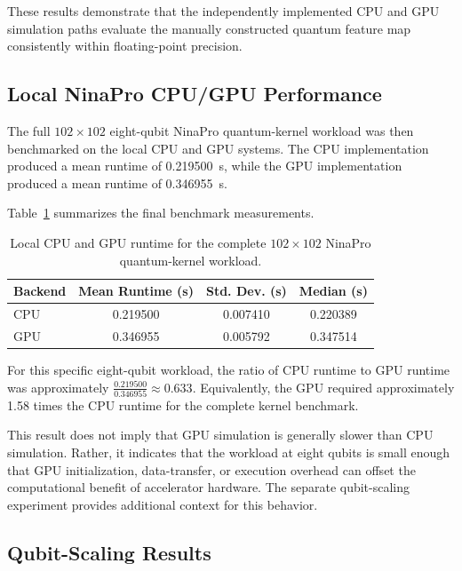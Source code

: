 \documentclass[pdflatex,sn-mathphys-num]{sn-jnl}%
\theoremstyle{thmstyleone}%
\theoremstyle{thmstyletwo}%
\theoremstyle{thmstylethree}%
\begin{document}
These results demonstrate that the independently implemented CPU and GPU
simulation paths evaluate the manually constructed quantum feature map
consistently within floating-point precision.


\subsection{Local NinaPro CPU/GPU Performance}
\label{subsec:local-performance-results}

The full $102\times102$ eight-qubit NinaPro quantum-kernel workload was then
benchmarked on the local CPU and GPU systems. The CPU implementation produced a
mean runtime of 0.219500~s, while the GPU implementation produced a mean runtime
of 0.346955~s.

Table~\ref{tab:local-cpu-gpu} summarizes the final benchmark measurements.

\begin{table}[htbp]
\centering
\caption{Local CPU and GPU runtime for the complete $102\times102$ NinaPro
quantum-kernel workload.}
\label{tab:local-cpu-gpu}
\begin{tabular}{lccc}
\toprule
Backend & Mean Runtime (s) & Std. Dev. (s) & Median (s) \\
\midrule
CPU & 0.219500 & 0.007410 & 0.220389 \\
GPU & 0.346955 & 0.005792 & 0.347514 \\
\bottomrule
\end{tabular}
\end{table}

For this specific eight-qubit workload, the ratio of CPU runtime to GPU runtime
was approximately \(\frac{0.219500}{0.346955} \approx 0.633\).
Equivalently, the GPU required approximately 1.58 times the CPU runtime for the
complete kernel benchmark.

This result does not imply that GPU simulation is generally slower than CPU
simulation. Rather, it indicates that the workload at eight qubits is small
enough that GPU initialization, data-transfer, or execution overhead can offset
the computational benefit of accelerator hardware. The separate qubit-scaling
experiment provides additional context for this behavior.


\subsection{Qubit-Scaling Results}
\label{subsec:qubit-scaling-results}
\end{document}
